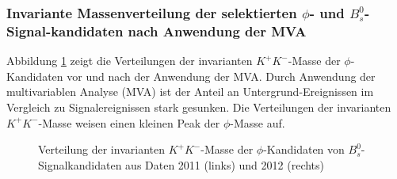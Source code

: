 \documentclass{article}
\begin{document}





\subsubsection[Invariante Massenverteilung der selektierten $\phi$- und $B_s^0$-Signalkandidaten nach Anwendung der MVA]{Invariante Massenverteilung der selektierten $\phi$- und $B_s^0$-Signal-kandidaten nach Anwendung der MVA}
\label{ch:massmodell}
Abbildung \ref{fig:mphi} zeigt die Verteilungen der invarianten $K^+K^-$-Masse der $\phi$-Kandidaten vor und nach der Anwendung der MVA. Durch Anwendung der multivariablen Analyse (MVA) ist der Anteil an Untergrund-Ereignissen im Vergleich zu Signalereignissen stark gesunken. Die Verteilungen der invarianten $K^+K^-$-Masse weisen einen kleinen Peak der $\phi$-Masse auf.

\begin{figure}[h!]
\centering
\caption{Verteilung der invarianten $K^+K^-$-Masse der $\phi$-Kandidaten von $B_s^0$-Signalkandidaten aus Daten 2011 (links) und 2012 (rechts)}
\label{fig:mphi}
\end{figure} 
\end{document}
